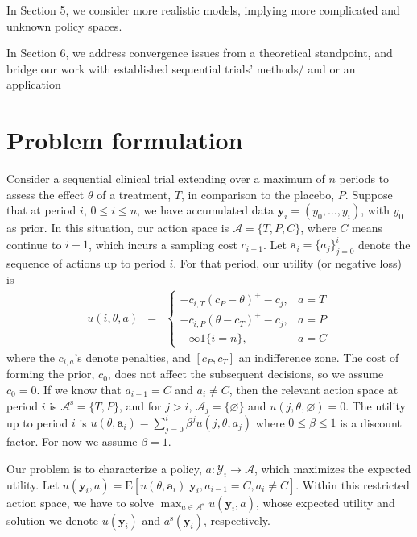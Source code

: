 \documentclass{article}
\begin{document}
In Section 5, we consider more realistic models, implying more
complicated and unknown policy spaces.

In Section 6, we address convergence issues from a theoretical
standpoint, and bridge our work with established sequential trials'
methods/ and or an application

\section{Problem formulation}\label{sec:formul}
Consider a sequential clinical trial extending over a maximum of $n$
periods to assess the effect $\theta$ of a treatment, $T$, in
comparison to the placebo, $P$. Suppose that at period $i$, $0\leq
i\leq n$, we have accumulated data $\mathbf{y}_i=(y_0,\ldots,y_i)$,
with $y_0$ as prior. In this situation, our action space is
$\mathcal{A}=\{T,P,C\}$, where $C$ means continue to $i+1$, which
incurs a sampling cost $c_{i+1}$. Let
$\mathbf{a}_i=\{a_j\}_{j=0}^{i}$ denote the sequence of actions up
to period $i$. For that period, our utility (or negative loss) is
\begin{eqnarray}\label{util}
u(i,\theta,a)&=&\left\{
\begin{array}{ll}
-c_{i,T}(c_P-\theta)^{+}-c_j,& a=T\\
-c_{i,P}(\theta-c_T)^{+}-c_j,&
a=P\\
-\infty 1\{i=n\},& a=C
\end{array}\right.
\end{eqnarray}where the $c_{i,a}$'s denote penalties, and
$[c_P,c_T]$ an indifference zone. The cost of forming the prior,
$c_0$, does not affect the subsequent decisions, so we assume
$c_0=0$. If we know that $a_{i-1}=C$ and $a_i\neq C$, then the
relevant action space at period $i$ is
$\mathcal{A}^{\mathrm{s}}=\{T,P\}$, and for $j>i$,
$\mathcal{A}_{j}=\{\varnothing\}$ and $u(j,\theta,\varnothing)=0$.
The utility up to period $i$ is
$u(\theta,\mathbf{a}_i)=\sum_{j=0}^{i}\beta^{j}u(j,\theta,a_j)$
where $0\leq\beta\leq 1$ is a discount factor. For now we assume
$\beta=1$.


Our problem is to characterize a policy,
$a:\boldsymbol{\mathcal{Y}}_i\rightarrow\mathcal{A}$, which
maximizes the expected utility. Let
$u(\mathbf{y}_i,a)=\mathrm{E}[u(\theta,\mathbf{a}_{i})|\mathbf{y}_i,a_{i-1}=C,a_{i}\neq
C]$. Within this restricted action space, we have to solve $
\max_{a\in\mathcal{A}^{\mathrm{s}}} u(\mathbf{y}_i,a)$, whose
expected utility and solution we denote $u(\mathbf{y}_i)$ and
$a^{\mathrm{s}}(\mathbf{y}_i)$, respectively.
\end{document}
